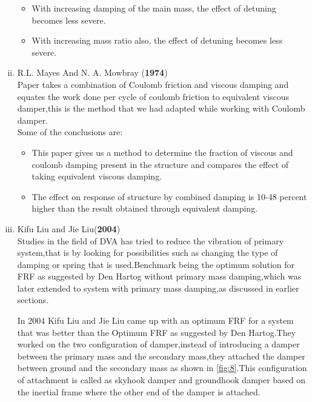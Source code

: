 \begin{enumerate}[i)]
\begin{itemize}
 \item With increasing damping of the main mass, the effect of detuning becomes less severe.

\item  With increasing mass ratio also, the effect of detuning becomes less severe.

\end{itemize}

\item {R.L. Mayes And N. A. Mowbray (\textbf{1974})}\\
Paper takes a combination of Coulomb friction and viscous damping and equates the work done per cycle of coulomb friction  to equivalent viscous damper,this is the method that we had adapted while working with Coulomb damper.\\
Some of the conclusions are:
\begin{itemize}
\item This paper gives us a method to determine the fraction of viscous and coulomb damping present in the structure and compares the effect of taking equivalent viscous damping.

\item The effect on response of structure by combined damping is 10-48 percent higher than the result obtained through equivalent damping.
\end{itemize}

\item {Kifu Liu and Jie Liu(\textbf{2004})}\\
Studies in the field of DVA has tried to reduce the vibration of primary system,that is by  looking for possibilities such as changing the type of damping or spring that is used.Benchmark being the optimum solution for FRF as suggested by Den Hartog without primary mass damping,which was later extended to system with primary mass damping,as discussed in earlier sections.

In 2004 Kifu Liu and Jie Liu came up with an optimum FRF for a system that was better than the Optimum FRF as suggested by Den Hartog.They worked on the two configuration of damper,instead of introducing a damper between the primary mass and the secondary mass,they attached the damper between ground and the secondary mass as shown in \ref{fig:8}.This configuration of attachment is called as skyhook damper and groundhook damper based on the inertial frame where the other end of the damper is attached.


\end{enumerate}
